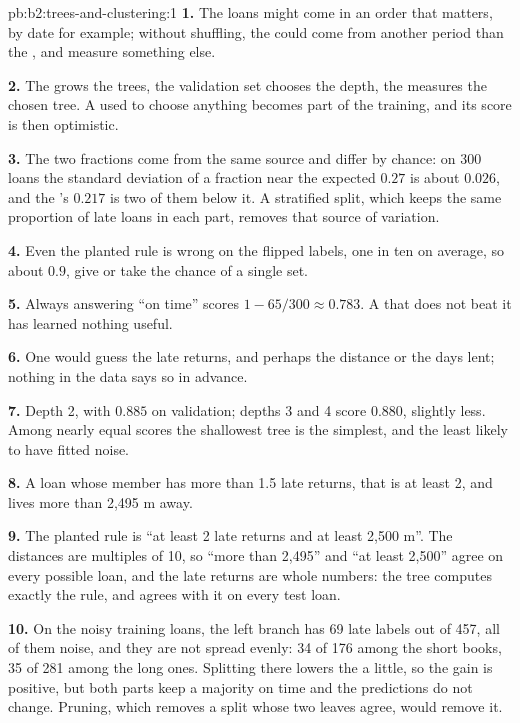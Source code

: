 \begin{solution}{pb:b2:trees-and-clustering:1}
\textbf{1.} The loans might come in an order that matters, by date for example; without shuffling, the  could
come from another period than the , and measure something else.

\textbf{2.} The  grows the trees, the validation set chooses the depth, the  measures the chosen
tree. A  used to choose anything becomes part of the training, and its score is then optimistic.

\textbf{3.} The two fractions come from the same source and differ by chance: on 300 loans the standard deviation of a
fraction near the expected $0.27$ is about $0.026$, and the 's $0.217$ is two of them below it. A stratified split, which keeps the same
proportion of late loans in each part, removes that source of variation.

\textbf{4.} Even the planted rule is wrong on the flipped labels, one in ten on average, so about $0.9$, give or take
the chance of a single set.

\textbf{5.} Always answering ``on time'' scores $1 - 65/300 \approx 0.783$. A  that does not beat it has
learned nothing useful.

\textbf{6.} One would guess the late returns, and perhaps the distance or the days lent; nothing in the data says so in
advance.

\textbf{7.} Depth 2, with $0.885$ on validation; depths 3 and 4 score $0.880$, slightly less. Among nearly equal scores
the shallowest tree is the simplest, and the least likely to have fitted noise.

\textbf{8.} A loan whose member has more than 1.5 late returns, that is at least 2, and lives more than 2,495 m away.

\textbf{9.} The planted rule is ``at least 2 late returns and at least 2,500 m''. The distances are multiples of 10, so
``more than 2,495'' and ``at least 2,500'' agree on every possible loan, and the late returns are whole numbers: the
tree computes exactly the rule, and agrees with it on every test loan.

\textbf{10.} On the noisy training loans, the left branch has 69 late labels out of 457, all of them noise, and they are
not spread evenly: 34 of 176 among the short books, 35 of 281 among the long ones. Splitting there lowers the  a
little, so the gain is positive, but both parts keep a majority on time and the predictions do not change. Pruning,
which removes a split whose two leaves agree, would remove it.


\end{solution}
